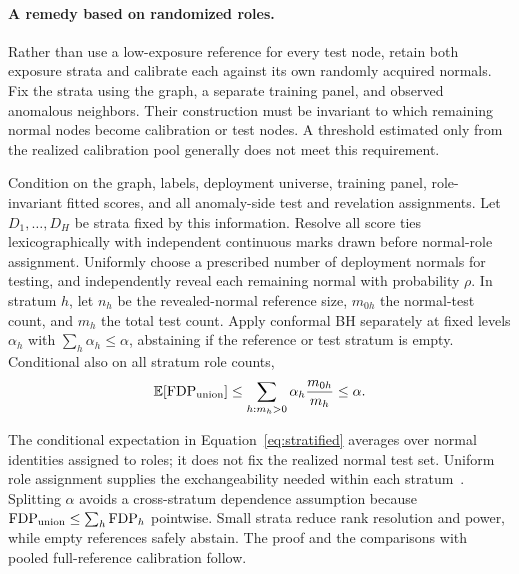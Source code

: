 \paragraph{A remedy based on randomized roles.}
Rather than use a low-exposure reference for every test node, retain both exposure strata and calibrate each against its own randomly acquired normals. Fix the strata using the graph, a separate training panel, and observed anomalous neighbors. Their construction must be invariant to which remaining normal nodes become calibration or test nodes. A threshold estimated only from the realized calibration pool generally does not meet this requirement.

\begin{lemma}
\label{lem:stratified}
Condition on the graph, labels, deployment universe, training panel, role-invariant fitted scores, and all anomaly-side test and revelation assignments. Let $D_1,\ldots,D_H$ be strata fixed by this information. Resolve all score ties lexicographically with independent continuous marks drawn before normal-role assignment. Uniformly choose a prescribed number of deployment normals for testing, and independently reveal each remaining normal with probability $\rho$. In stratum $h$, let $n_h$ be the revealed-normal reference size, $m_{0h}$ the normal-test count, and $m_h$ the total test count. Apply conformal BH separately at fixed levels $\alpha_h$ with $\sum_h\alpha_h\le\alpha$, abstaining if the reference or test stratum is empty. Conditional also on all stratum role counts,
\begin{equation}
\mathbb{E}[\operatorname{FDP}_{\rm union}]
\le\sum_{h:m_h>0}\alpha_h\frac{m_{0h}}{m_h}\le\alpha.
\label{eq:stratified}
\end{equation}
\end{lemma}
The conditional expectation in Equation~\eqref{eq:stratified} averages over normal identities assigned to roles; it does not fix the realized normal test set. Uniform role assignment supplies the exchangeability needed within each stratum~\citep{marandon2024adaptive}. Splitting $\alpha$ avoids a cross-stratum dependence assumption because $\operatorname{FDP}_{\rm union}\le\sum_h\operatorname{FDP}_h$ pointwise. Small strata reduce rank resolution and power, while empty references safely abstain. The proof and the comparisons with pooled full-reference calibration follow.
